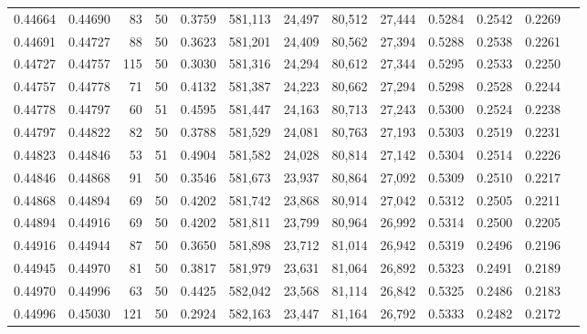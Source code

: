 \begin{tabular}{rrrrrrrrrrrrr}
0.44664 & 0.44690 &    83 &  50 &                                     0.3759 & 581,113 &  24,497 &  80,512 &  27,444 & 0.5284 & 0.2542 & 0.2269 \\
0.44691 & 0.44727 &    88 &  50 &                                     0.3623 & 581,201 &  24,409 &  80,562 &  27,394 & 0.5288 & 0.2538 & 0.2261 \\
0.44727 & 0.44757 &   115 &  50 &                                     0.3030 & 581,316 &  24,294 &  80,612 &  27,344 & 0.5295 & 0.2533 & 0.2250 \\
0.44757 & 0.44778 &    71 &  50 &                                     0.4132 & 581,387 &  24,223 &  80,662 &  27,294 & 0.5298 & 0.2528 & 0.2244 \\
0.44778 & 0.44797 &    60 &  51 &                                     0.4595 & 581,447 &  24,163 &  80,713 &  27,243 & 0.5300 & 0.2524 & 0.2238 \\
0.44797 & 0.44822 &    82 &  50 &                                     0.3788 & 581,529 &  24,081 &  80,763 &  27,193 & 0.5303 & 0.2519 & 0.2231 \\
0.44823 & 0.44846 &    53 &  51 &                                     0.4904 & 581,582 &  24,028 &  80,814 &  27,142 & 0.5304 & 0.2514 & 0.2226 \\
0.44846 & 0.44868 &    91 &  50 &                                     0.3546 & 581,673 &  23,937 &  80,864 &  27,092 & 0.5309 & 0.2510 & 0.2217 \\
0.44868 & 0.44894 &    69 &  50 &                                     0.4202 & 581,742 &  23,868 &  80,914 &  27,042 & 0.5312 & 0.2505 & 0.2211 \\
0.44894 & 0.44916 &    69 &  50 &                                     0.4202 & 581,811 &  23,799 &  80,964 &  26,992 & 0.5314 & 0.2500 & 0.2205 \\
0.44916 & 0.44944 &    87 &  50 &                                     0.3650 & 581,898 &  23,712 &  81,014 &  26,942 & 0.5319 & 0.2496 & 0.2196 \\
0.44945 & 0.44970 &    81 &  50 &                                     0.3817 & 581,979 &  23,631 &  81,064 &  26,892 & 0.5323 & 0.2491 & 0.2189 \\
0.44970 & 0.44996 &    63 &  50 &                                     0.4425 & 582,042 &  23,568 &  81,114 &  26,842 & 0.5325 & 0.2486 & 0.2183 \\
0.44996 & 0.45030 &   121 &  50 &                                     0.2924 & 582,163 &  23,447 &  81,164 &  26,792 & 0.5333 & 0.2482 & 0.2172 \\

\end{tabular}
